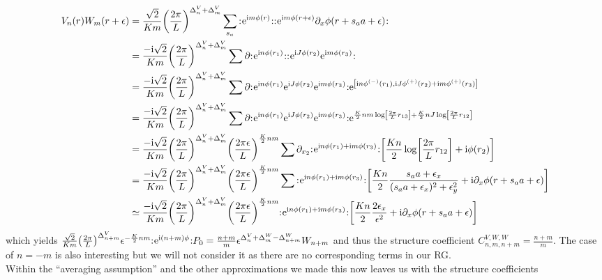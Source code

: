 \documentclass[english, parskip=full]{scrartcl}
\begin{document}
\begin{align}
V_n(r) W_m(r+\epsilon) &= \frac{\sqrt{2}}{Km} \kla*{\frac{2\pi}{L}}^{\Delta^V_n + \Delta^V_m} \sum_{s_a} \normord{\powe{\i m\phi(r)} } \normord{\powe{\i m\phi(r+\epsilon)}\partial_x\phi(r+s_aa+\epsilon)}\\
&= \frac{-\i \sqrt{2}}{Km} \kla*{\frac{2\pi}{L}}^{\Delta^V_n + \Delta^V_m} \sum \partial \normord{\powe{\i n\phi(r_1)}} \normord{ \powe{\i J\phi(r_2)} \powe{\i m\phi(r_3)}}\\
&= \frac{-\i \sqrt{2}}{Km} \kla*{\frac{2\pi}{L}}^{\Delta^V_n + \Delta^V_m} \sum \partial \normord{\powe{\i n\phi(r_1)} \powe{\i J\phi(r_2)} \powe{\i m\phi(r_3)}} \powe{\klb*{\i n\phi^{(-)}(r_1), \i J \phi^{(+)}(r_2) + \i m\phi^{(+)}(r_3)}}\\
&= \frac{-\i \sqrt{2}}{Km} \kla*{\frac{2\pi}{L}}^{\Delta^V_n + \Delta^V_m} \sum \partial \normord{\powe{\i n\phi(r_1)} \powe{\i J\phi(r_2)} \powe{\i m\phi(r_3)}} \powe{ \frac{K}{2}nm \log\klb*{\frac{2\pi}{L}r_{13}} + \frac{K}{2}nJ \log \klb*{\frac{2\pi}{L} r_{12}} }\\
&= \frac{-\i \sqrt{2}}{Km} \kla*{\frac{2\pi}{L}}^{\Delta^V_n + \Delta^V_m} \kla*{\frac{2\pi\epsilon}{L}}^{\frac{K}{2}nm} \sum \partial_{x_2} \normord{\powe{\i n\phi(r_1)+\i m\phi(r_3)}}  \klb*{\frac{Kn}{2} \log \klb*{\frac{2\pi}{L} r_{12}} + \i\phi(r_2)}\\
&= \frac{-\i \sqrt{2}}{Km} \kla*{\frac{2\pi}{L}}^{\Delta^V_n + \Delta^V_m} \kla*{\frac{2\pi\epsilon}{L}}^{\frac{K}{2}nm} \sum \normord{\powe{\i n\phi(r_1)+\i m\phi(r_3)}} \klb*{ \frac{Kn}{2} \frac{s_aa + \epsilon_x}{(s_aa + \epsilon_x)^2 + \epsilon_y^2} + \i \partial_x\phi(r+s_aa+\epsilon)}\\
&\simeq \frac{-\i \sqrt{2}}{Km} \kla*{\frac{2\pi}{L}}^{\Delta^V_n + \Delta^V_m} \kla*{\frac{2\pi\epsilon}{L}}^{\frac{K}{2}nm} \normord{\powe{\i n\phi(r_1)+\i m\phi(r_3)}} \klb*{ \frac{Kn}{2} \frac{2\epsilon_x}{\epsilon^2} + \i\partial_x\phi(r+s_aa+\epsilon)}
\end{align}
which yields $\frac{\sqrt{2}}{Km} \kla*{\frac{2\pi}{L}}^{\Delta_{n+m}^V} \epsilon^{-\frac{K}{2}nm} \normord{\powe{\i (n+m)\phi}} P_0 = \frac{n+m}{m} \epsilon^{\Delta^V_n + \Delta^W_m - \Delta^W_{n+m}}  W_{n+m}$ and thus the structure coefficient $C^{V,W,W}_{n,m,n+m} = \frac{n+m}{m}$.
The case of $n=-m$ is also interesting but we will not consider it as there are no corresponding terms in our RG.\\
Within the ``averaging assumption'' and the other approximations we made this now leaves us with the structure coefficients
\end{document}
